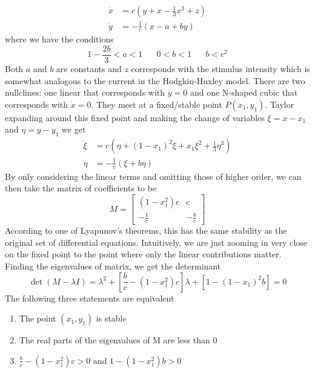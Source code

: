 \documentclass{article}
\newcommand{\twen}{\hspace{20pt}}
\numberwithin{equation}{section}
\begin{document}
\begin{equation}
\begin{split}
    \dot{x} &= c(y+x-\tfrac{1}{3}x^3+z) \\ 
    \dot{y} &= -\tfrac{1}{c} (x-a+by)
\end{split}
\end{equation}
where we have the conditions
\begin{equation}
    1-\frac{2b}{3} < a < 1 \twen 0 < b<1 \twen b<c^2
\end{equation}
Both $a$ and $b$ are constants and $z$ corresponds with the stimulus intensity which is somewhat analogous to the current in the Hodgkin-Huxley model. There are two nullclines: one linear that corresponds with $\dot{y}=0$ and one N-shaped cubic that corresponds with $\dot{x} = 0$. They meet at a fixed/stable point $P(x_1,y_1)$. Taylor expanding around this fixed point and making the change of variables $\xi=x-x_1$ and $\eta = y-y_1$ we get
\begin{equation}
\begin{split}
    \dot{\xi} &= c(\eta + (1-x_1)^2\xi +x_1\xi^2+\tfrac{1}{3}\eta^3) \\
    \dot{\eta} &= - \tfrac{1}{c}(\xi +b\eta) 
\end{split}
\end{equation}
By only considering the linear terms and omitting those of higher order, we can then take the matrix of coefficients to be 
\begin{equation}
    M= \begin{bmatrix}
        (1-x_1^2)c &c \\
        -\frac{1}{c} & -\frac{b}{c}
    \end{bmatrix}
\end{equation}
According to one of Lyapunov's theorems, this has the same stability as the original set of differential equations. Intuitively, we are just zooming in very close on the fixed point to the point where only the linear contributions matter. Finding the eigenvalues of matrix, we get the determinant
\begin{equation}
    \det(M-\lambda I) = \lambda^2 + \left[ \frac{b}{c} - (1-x_1^2)c \right]\lambda + [1-(1-x_1)^2b] = 0
\end{equation}
The following three statements are equivalent 
\begin{enumerate}
    \item The point $(x_1,y_1)$ is stable
    \item The real parts of the eigenvalues of M are less than 0
    \item $\frac{b}{c}-(1-x_1^2)c>0$ and $1-(1-x_1^2)b>0$
\end{enumerate}
\end{document}
